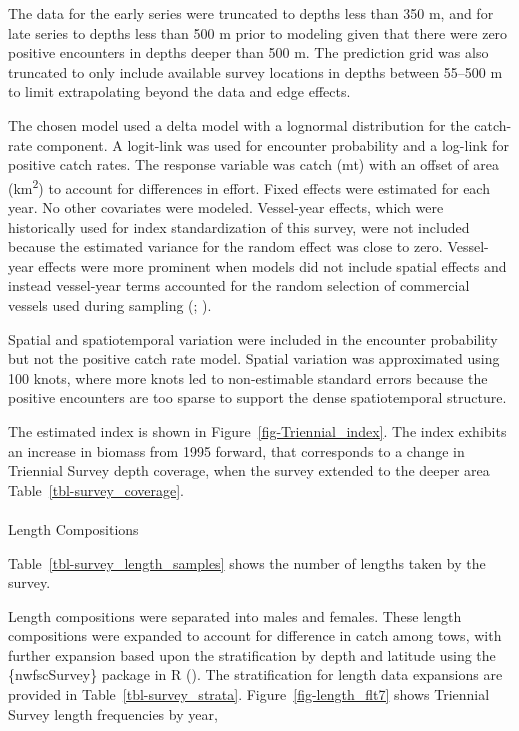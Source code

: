 \documentclass[
]{scrartcl}
\makeatletter
\let\oldparagraph\paragraph
\renewcommand{\paragraph}{
    \@ifstar
      \xxxParagraphStar
      \xxxParagraphNoStar
  }
\newcommand{\xxxParagraphStar}[1]{\oldparagraph*{#1}\mbox{}}
\newcommand{\xxxParagraphNoStar}[1]{\oldparagraph{#1}\mbox{}}
\makeatother
\begin{document}
The data for the early series were truncated to depths less than 350 m,
and for late series to depths less than 500 m prior to modeling given
that there were zero positive encounters in depths deeper than 500 m.
The prediction grid was also truncated to only include available survey
locations in depths between 55--500 m to limit extrapolating beyond the
data and edge effects.

The chosen model used a delta model with a lognormal distribution for
the catch-rate component. A logit-link was used for encounter
probability and a log-link for positive catch rates. The response
variable was catch (mt) with an offset of area (km\textsuperscript{2})
to account for differences in effort. Fixed effects were estimated for
each year. No other covariates were modeled. Vessel-year effects, which
were historically used for index standardization of this survey, were
not included because the estimated variance for the random effect was
close to zero. Vessel-year effects were more prominent when models did
not include spatial effects and instead vessel-year terms accounted for
the random selection of commercial vessels used during sampling
(;
).

Spatial and spatiotemporal variation were included in the encounter
probability but not the positive catch rate model. Spatial variation was
approximated using 100 knots, where more knots led to non-estimable
standard errors because the positive encounters are too sparse to
support the dense spatiotemporal structure.

The estimated index is shown in Figure~\ref{fig-Triennial_index}. The
index exhibits an increase in biomass from 1995 forward, that
corresponds to a change in Triennial Survey depth coverage, when the
survey extended to the deeper area Table~\ref{tbl-survey_coverage}.

\paragraph{Length Compositions}\label{length-compositions}

Table~\ref{tbl-survey_length_samples} shows the number of lengths taken
by the survey.

Length compositions were separated into males and females. These length
compositions were expanded to account for difference in catch among
tows, with further expansion based upon the stratification by depth and
latitude using the \{nwfscSurvey\} package in R
(). The stratification for length data expansions are provided in
Table~\ref{tbl-survey_strata}. Figure~\ref{fig-length_flt7} shows
Triennial Survey length frequencies by year,
\end{document}

